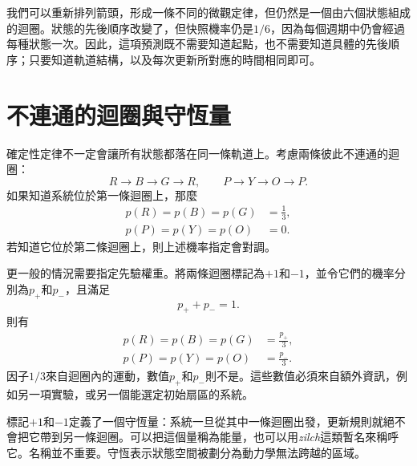 我們可以重新排列箭頭，形成一條不同的微觀定律，但仍然是一個由六個狀態組成的迴圈。狀態的先後順序改變了，但快照機率仍是\(1/6\)，因為每個週期中仍會經過每種狀態一次。因此，這項預測既不需要知道起點，也不需要知道具體的先後順序；只要知道軌道結構，以及每次更新所對應的時間相同即可。

\begin{classroomqa}
\end{classroomqa}

\section{不連通的迴圈與守恆量}

確定性定律不一定會讓所有狀態都落在同一條軌道上。考慮兩條彼此不連通的迴圈：
\begin{equation}
 R\longrightarrow B\longrightarrow G\longrightarrow R,
 \qquad
 P\longrightarrow Y\longrightarrow O\longrightarrow P.
 \label{eq:sm1-two-cycles}
\end{equation}
如果知道系統位於第一條迴圈上，那麼
\begin{equation}
 \begin{aligned}
 p(R)=p(B)=p(G)&=\frac13,\\
 p(P)=p(Y)=p(O)&=0.
 \end{aligned}
\end{equation}
若知道它位於第二條迴圈上，則上述機率指定會對調。

更一般的情況需要指定先驗權重。將兩條迴圈標記為\(+1\)和\(-1\)，並令它們的機率分別為\(p_+\)和\(p_-\)，且滿足
\begin{equation}
 p_++p_-=1.
\end{equation}
則有
\begin{align}
 p(R)=p(B)=p(G)&=\frac{p_+}{3},\\
 p(P)=p(Y)=p(O)&=\frac{p_-}{3}.
 \label{eq:sm1-sector-weights}
\end{align}
因子\(1/3\)來自迴圈內的運動，數值\(p_+\)和\(p_-\)則不是。這些數值必須來自額外資訊，例如另一項實驗，或另一個能選定初始扇區的系統。

標記\(+1\)和\(-1\)定義了一個守恆量：系統一旦從其中一條迴圈出發，更新規則就絕不會把它帶到另一條迴圈。可以把這個量稱為能量，也可以用\emph{zilch}這類暫名來稱呼它。名稱並不重要。守恆表示狀態空間被劃分為動力學無法跨越的區域。

